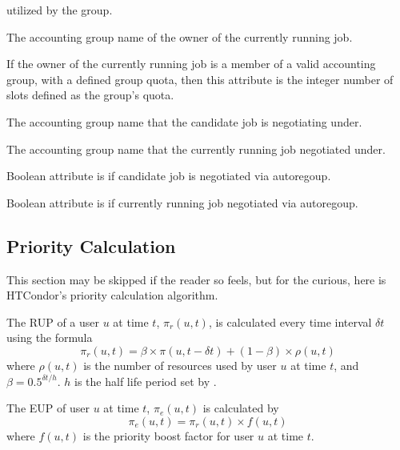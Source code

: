 \begin{description}
  utilized by the group.
\item[\index{ClassAd attribute, ephemeral!RemoteGroup}\AdAttr{RemoteGroup}:]
  The accounting group name of the owner of the currently running job.
\item[\index{ClassAd attribute, ephemeral!RemoteGroupQuota}\AdAttr{RemoteGroupQuota}:]
  If the owner of the currently running job is a member of a valid 
  accounting group, with a defined group quota,
  then this attribute is the integer number of slots defined as the
  group's quota.
\item[\index{ClassAd attribute, ephemeral!SubmitterNegotiatingGroup}\AdAttr{SubmitterNegotiatingGroup}:]
  The accounting group name that the candidate job is negotiating under.
\item[\index{ClassAd attribute, ephemeral!RemoteNegotiatingGroup}\AdAttr{RemoteNegotiatingGroup}:]
  The accounting group name that the currently running job negotiated under.
\item[\index{ClassAd attribute, ephemeral!SubmitterAutoregroup}\AdAttr{SubmitterAutoregroup}:]
  Boolean attribute is  if candidate job is negotiated via autoregoup.
\item[\index{ClassAd attribute, ephemeral!RemoteAutoregroup}\AdAttr{RemoteAutoregroup}:]
  Boolean attribute is  if currently running job negotiated via autoregoup.
\end{description}


\subsection{Priority Calculation}
This section may be skipped if the reader so feels, but for the curious,
here is HTCondor's priority calculation algorithm.

The RUP of a user $u$ at time $t$, $\pi_r(u,t)$, is calculated 
every time interval $\delta t$ using the formula 
$$\pi_r(u,t) = \beta\times\pi(u,t-\delta t) + (1-\beta)\times\rho(u,t)$$
where $\rho(u,t)$ is the number of resources used by user $u$ at time $t$,
and $\beta=0.5^{{\delta t}/h}$. $h$ is the half life period set by 
.

The EUP of user $u$ at time $t$, $\pi_e(u,t)$
is calculated by
$$\pi_e(u,t) = \pi_r(u,t)\times f(u,t)$$
where $f(u,t)$ is the priority boost factor for user $u$ at time $t$.

